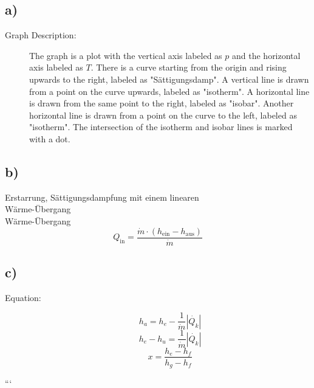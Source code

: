 \subsection*{a)}

\begin{description}
    \item[Graph Description:] The graph is a plot with the vertical axis labeled as $p$ and the horizontal axis labeled as $T$. There is a curve starting from the origin and rising upwards to the right, labeled as "Sättigungsdamp". A vertical line is drawn from a point on the curve upwards, labeled as "isotherm". A horizontal line is drawn from the same point to the right, labeled as "isobar". Another horizontal line is drawn from a point on the curve to the left, labeled as "isotherm". The intersection of the isotherm and isobar lines is marked with a dot.
\end{description}

\subsection*{b)}

Erstarrung, Sättigungsdampfung mit einem linearen \\
Wärme-Übergang \\
Wärme-Übergang \\
\[
Q_{\text{in}} = \frac{\dot{m} \cdot (h_{\text{ein}} - h_{\text{aus}})}{\dot{m}}
\]

\subsection*{c)}

\begin{description}
    \item[Equation:] 
    \[
    h_a = h_e - \frac{1}{\dot{m}} \left| \dot{Q_k} \right|
    \]
    \[
    h_e - h_u = \frac{1}{\dot{m}} \left| \dot{Q_k} \right|
    \]
    \[
    x = \frac{h_e - h_f}{h_g - h_f}
    \]
\end{description}

```